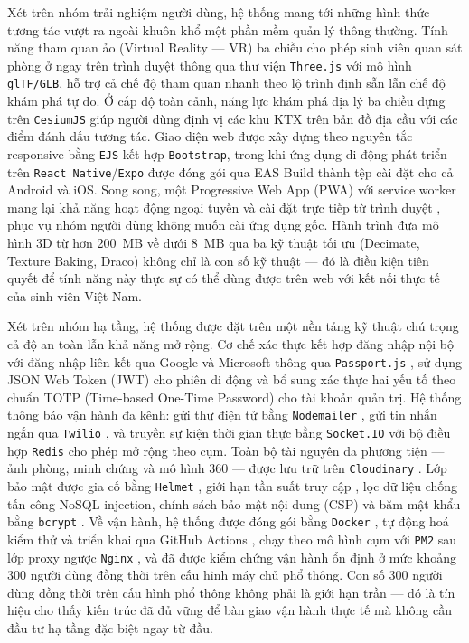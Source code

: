 \documentclass[../DoAn.tex]{subfiles}
\begin{document}
Xét trên nhóm trải nghiệm người dùng, hệ thống mang tới những hình thức tương
tác vượt ra ngoài khuôn khổ một phần mềm quản lý thông thường. Tính năng tham
quan ảo (Virtual Reality --- VR) ba chiều cho phép sinh viên quan sát phòng ở
ngay trên trình duyệt thông qua thư viện \texttt{Three.js} \cite{threejs} với
mô hình \texttt{glTF/GLB}, hỗ trợ cả chế độ tham quan nhanh theo lộ trình định
sẵn lẫn chế độ khám phá tự do. Ở cấp độ toàn cảnh, năng lực khám phá địa lý
ba chiều dựng trên \texttt{CesiumJS} \cite{cesiumjs} giúp người dùng định vị
các khu KTX trên bản đồ địa cầu với các điểm đánh dấu tương tác. Giao diện
web được xây dựng theo nguyên tắc responsive bằng \texttt{EJS} kết hợp
\texttt{Bootstrap}, trong khi ứng dụng di động phát triển trên
\texttt{React~Native}/\texttt{Expo} \cite{reactnative2024, expo2024router} được
đóng gói qua EAS Build thành tệp cài đặt cho cả Android và iOS. Song song, một
Progressive Web App (PWA) với service worker mang lại khả năng hoạt động ngoại
tuyến và cài đặt trực tiếp từ trình duyệt \cite{webdev_pwa, w3c_manifest}, phục
vụ nhóm người dùng không muốn cài ứng dụng gốc. Hành trình đưa mô hình 3D từ
hơn 200~MB về dưới 8~MB qua ba kỹ thuật tối ưu (Decimate, Texture Baking, Draco)
không chỉ là con số kỹ thuật --- đó là điều kiện tiên quyết để tính năng này
thực sự có thể dùng được trên web với kết nối thực tế của sinh viên Việt Nam.

Xét trên nhóm hạ tầng, hệ thống được đặt trên một nền tảng kỹ thuật chú trọng
cả độ an toàn lẫn khả năng mở rộng. Cơ chế xác thực kết hợp đăng nhập nội bộ
với đăng nhập liên kết qua Google và Microsoft thông qua \texttt{Passport.js}
\cite{passportjs_docs}, sử dụng JSON Web Token (JWT) \cite{rfc7519} cho phiên
di động và bổ sung xác thực hai yếu tố theo chuẩn TOTP (Time-based One-Time
Password) \cite{rfc6238} cho tài khoản quản trị. Hệ thống thông báo vận hành
đa kênh: gửi thư điện tử bằng \texttt{Nodemailer} \cite{nodemailer_docs}, gửi
tin nhắn ngắn qua \texttt{Twilio} \cite{twilio_docs}, và truyền sự kiện thời
gian thực bằng \texttt{Socket.IO} \cite{socketio2024docs} với bộ điều hợp
\texttt{Redis} \cite{redis2024pubsub} cho phép mở rộng theo cụm. Toàn bộ tài
nguyên đa phương tiện --- ảnh phòng, minh chứng và mô hình 360\textdegree{} ---
được lưu trữ trên \texttt{Cloudinary} \cite{cloudinary_docs}. Lớp bảo mật được
gia cố bằng \texttt{Helmet} \cite{helmet_docs}, giới hạn tần suất truy cập
\cite{express_rate_limit}, lọc dữ liệu chống tấn công NoSQL injection, chính
sách bảo mật nội dung (CSP) và băm mật khẩu bằng \texttt{bcrypt}
\cite{bcrypt_npm}. Về vận hành, hệ thống được đóng gói bằng \texttt{Docker}
\cite{docker_docs}, tự động hoá kiểm thử và triển khai qua GitHub Actions
\cite{github_actions}, chạy theo mô hình cụm với \texttt{PM2} \cite{pm2_docs}
sau lớp proxy ngược \texttt{Nginx} \cite{nginx_docs}, và đã được kiểm chứng
vận hành ổn định ở mức khoảng 300 người dùng đồng thời trên cấu hình máy chủ
phổ thông. Con số 300 người dùng đồng thời trên cấu hình phổ thông không phải
là giới hạn trần --- đó là tín hiệu cho thấy kiến trúc đã đủ vững để bàn giao
vận hành thực tế mà không cần đầu tư hạ tầng đặc biệt ngay từ đầu.
\end{document}

